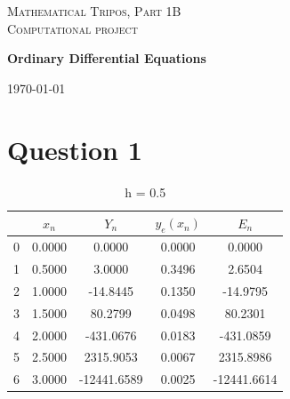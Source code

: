 \documentclass[11pt]{article}
\begin{document}
\begin{titlepage} %
	
	\center %
	
	\vspace*{8cm}
	\vfill\vfill
	\textsc{Mathematical Tripos, Part 1B}\\
	\textsc{Computational project}
	\begin{center}
      {\huge\bfseries Ordinary Differential Equations\\[0.4cm]
}     \end{center}
	
	\vfill
	
	
	
	
	\vspace*{\fill}
	\vfill\vfill\vfill %
	
	{\large\today} %
	\vfill
\end{titlepage}
\section*{Question 1}
\begin{table}[!htb]
\centering
\caption{ h = 0.5}
\begin{tabular}{|c|c|c|c|c|}                
\hline                                      
 & $x_{n}$ & $Y_{n} $& $y_{e}(x_{n})$ & $E_{n}$\\                
\hline                                      
0 & 0.0000 & 0.0000 & 0.0000 & 0.0000 \\          
\hline                                            
1 & 0.5000 & 3.0000 & 0.3496 & 2.6504 \\          
\hline                                            
2 & 1.0000 & -14.8445 & 0.1350 & -14.9795 \\      
\hline                                            
3 & 1.5000 & 80.2799 & 0.0498 & 80.2301 \\        
\hline                                            
4 & 2.0000 & -431.0676 & 0.0183 & -431.0859 \\    
\hline                                            
5 & 2.5000 & 2315.9053 & 0.0067 & 2315.8986 \\    
\hline                                            
6 & 3.0000 & -12441.6589 & 0.0025 & -12441.6614 \\
\hline     
\end{tabular} 
\end{table}
      
\end{document}

